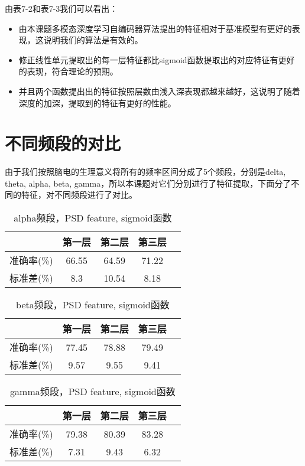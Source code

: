 	由表7-2和表7-3我们可以看出：
	\begin{itemize}
	\item 由本课题多模态深度学习自编码器算法提出的特征相对于基准模型有更好的表现，这说明我们的算法是有效的。
	\item 修正线性单元提取出的每一层特征都比sigmoid函数提取出的对应特征有更好的表现，符合理论的预期。
	\item 并且两个函数提出出的特征按照层数由浅入深表现都越来越好，这说明了随着深度的加深，提取到的特征有更好的性能。
	\end{itemize}
	
\section{不同频段的对比}
	由于我们按照脑电的生理意义将所有的频率区间分成了5个频段，分别是delta, theta, alpha, beta, gamma，所以本课题对它们分别进行了特征提取，下面分了不同的特征，对不同频段进行了对比。

		\begin{table}[!h]
	\centering
\begin{tabular}{|c|c|c|c|c|}
\hline
\hline
  & 第一层 & 第二层 & 第三层 \\
\hline
准确率(\%) & 66.55 & 64.59 & 71.22\\
\hline
标准差(\%) & 8.3 & 10.54 &8.18\\
\hline
\end{tabular}
\caption{alpha频段，PSD feature, sigmoid函数}
\end{table} 

		\begin{table}[!h]
	\centering
\begin{tabular}{|c|c|c|c|c|}
\hline
\hline
  & 第一层 & 第二层 & 第三层 \\
\hline
准确率(\%) & 77.45 & 78.88 & 79.49\\
\hline
标准差(\%) & 9.57 & 9.55 & 9.41 \\
\hline
\end{tabular}
\caption{beta频段，PSD feature, sigmoid函数}
\end{table} 

		\begin{table}[!h]
	\centering
\begin{tabular}{|c|c|c|c|c|}
\hline
\hline
  & 第一层 & 第二层 & 第三层 \\
\hline
准确率(\%) & 79.38 & 80.39 & 83.28\\
\hline
标准差(\%) & 7.31 & 9.43 & 6.32 \\
\hline
\end{tabular}
\caption{gamma频段，PSD feature, sigmoid函数}
\end{table} 



